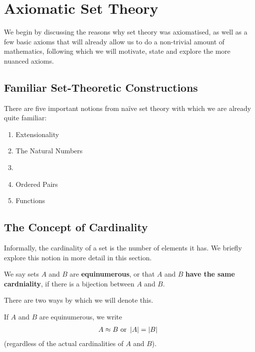 \section{Axiomatic Set Theory}

We begin by discussing the reasons why set theory was axiomatised, as well as a few basic axioms that will already allow us to do a non-trivial amount of mathematics, following which we will motivate, state and explore the more nuanced axioms.

\subsection{Familiar Set-Theoretic Constructions}

There are five important notions from naïve set theory with which we are already quite familiar:
\begin{enumerate}
    \item Extensionality
    \item The Natural Numbers
    \item \sorry %
    \item Ordered Pairs
    \item Functions
\end{enumerate}






\subsection{The Concept of Cardinality}

Informally, the cardinality of a set is the number of elements it has. We briefly explore this notion in more detail in this section.

\begin{boxdefinition}[Equinumerosity]
    We say sets $A$ and $B$ are \textbf{equinumerous}, or that $A$ and $B$ \textbf{have the same cardniality}, if there is a bijection between $A$ and $B$.
\end{boxdefinition}

There are two ways by which we will denote this.

\begin{boxconvention}
    If $A$ and $B$ are equinumerous, we write
    \begin{align*}
        A \approx B \text{ or } \left\lvert A \right\rvert = \left\lvert B \right\rvert
    \end{align*}
    (regardless of the actual cardinalities of $A$ and $B$).
\end{boxconvention}

